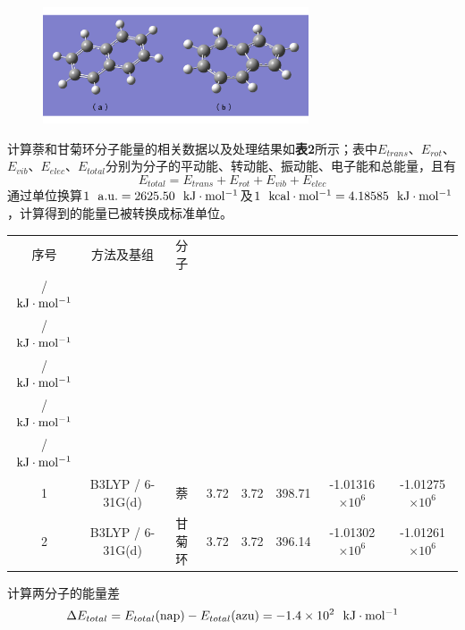 \documentclass[12pt]{article}
\begin{document}
 		 \begin{figure}[h]
 		 	\centering
 		 	\includegraphics[width=0.7\textwidth]{2.png}
 		 \end{figure}
 	 
 		计算萘和甘菊环分子能量的相关数据以及处理结果如\textbf{表2}所示；表中$E_{trans}$、$E_{rot}$、$E_{vib}$、$E_{elec}$、$E_{total}$分别为分子的平动能、转动能、振动能、电子能和总能量，且有$$ E_{total}=E_{trans}+E_{rot}+E_{vib}+E_{elec} $$ 
 		通过单位换算$ 1\ \ {\rm a.u.}=2625.50 \ \ {\rm kJ \cdot mol^{-1}} $及$1\ \ {\rm kcal \cdot mol^{-1}}=4.18585\ \ {\rm kJ \cdot mol^{-1}}$，计算得到的能量已被转换成标准单位。
 		  \begin{table}[h]
 			\centering
 			\begin{tabular}{cccccccc}
 			\toprule
 				序号 & 方法及基组 & 分子 & \thead[c] {$E_{trans}$ \\ / $ \rm kJ \cdot mol^{-1} $} & \thead[c]{$E_{rot}$ \\ / $ \rm kJ \cdot mol^{-1} $} & \thead[c]{$E_{vib}$ \\ / $ \rm kJ \cdot mol^{-1} $} & \thead[c] {$E_{elec}$ \\ / $ \rm kJ \cdot mol^{-1} $} & \thead[c]{$E_{total}$ \\ / $ \rm kJ \cdot mol^{-1} $} \\
 			\midrule
 			1 & B3LYP / 6-31G(d) & 萘 & 3.72 & 3.72 & 398.71 & -1.01316$\times10^{6}$ & -1.01275$\times10^{6}$ \\
 			2 & B3LYP / 6-31G(d) & 甘菊环 & 3.72 & 3.72 & 396.14 & -1.01302$\times10^{6}$ & -1.01261$\times10^{6}$ \\
 			\bottomrule
 			\end{tabular}
 		\end{table}\par
 	计算两分子的能量差$$\Delta E_{total}=E_{total}({\rm nap})-E_{total}{\rm (azu)=-1.4\times10^{2} \ \ kJ \cdot mol^{-1} }$$
 	
\end{document}
